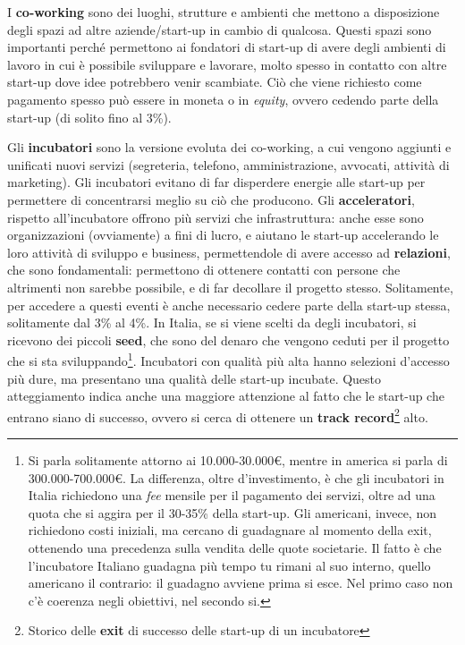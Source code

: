 \begin{enumerate}
I \textbf{co-working} sono dei luoghi, strutture e ambienti che mettono a
disposizione degli spazi ad altre aziende/start-up in cambio di qualcosa. Questi
spazi sono importanti perché permettono ai fondatori di start-up di avere degli
ambienti di lavoro in cui è possibile sviluppare e lavorare, molto spesso in
contatto con altre start-up dove idee potrebbero venir scambiate. Ciò che viene
richiesto come pagamento spesso può essere in moneta o in \textit{equity},
ovvero cedendo parte della start-up (di solito fino al 3\%).

Gli \textbf{incubatori} sono la versione evoluta dei co-working, a cui vengono
aggiunti e unificati nuovi servizi (segreteria, telefono, amministrazione,
avvocati, attività di marketing). Gli incubatori evitano di far disperdere
energie alle start-up per permettere di concentrarsi meglio su ciò che
producono. Gli \textbf{acceleratori}, rispetto all'incubatore offrono più
servizi che infrastruttura: anche esse sono organizzazioni (ovviamente) a fini
di lucro, e aiutano le start-up accelerando le loro attività di sviluppo e
business, permettendole di avere accesso ad \textbf{relazioni}, che sono
fondamentali: permettono di ottenere contatti con persone che altrimenti non
sarebbe possibile, e di far decollare il progetto stesso. Solitamente, per
accedere a questi eventi è anche necessario cedere parte della start-up stessa,
solitamente dal 3\% al 4\%. In Italia, se si viene scelti da degli incubatori,
si ricevono dei piccoli \textbf{seed}, che sono del denaro che vengono ceduti
per il progetto che si sta sviluppando\footnote{Si parla solitamente attorno ai
10.000-30.000\euro{}, mentre in america si parla di 300.000-700.000\euro{}. La
differenza, oltre d'investimento, è che gli incubatori in Italia richiedono una
\textit{fee} mensile per il pagamento dei servizi, oltre ad una quota che si
aggira per il 30-35\% della start-up. Gli americani, invece, non richiedono
costi iniziali, ma cercano di guadagnare al momento della exit, ottenendo una
precedenza sulla vendita delle quote societarie. Il fatto è che l'incubatore
Italiano guadagna più tempo tu rimani al suo interno, quello americano il
contrario: il guadagno avviene prima si esce. Nel primo caso non c'è coerenza
negli obiettivi, nel secondo si.}. Incubatori con qualità più alta hanno
selezioni d'accesso più dure, ma presentano una qualità delle start-up
incubate. Questo atteggiamento indica anche una maggiore attenzione al fatto
che le start-up che entrano siano di successo, ovvero si cerca di ottenere un
\textbf{track record}\footnote{Storico delle \textbf{exit} di successo delle
start-up di un incubatore} alto.


\end{enumerate}
